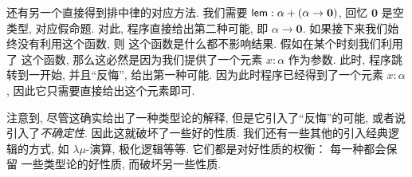 还有另一个直接得到排中律的对应方法. 我们需要
\(\textsf{lem} : \alpha + (\alpha \to \mathbf 0)\),
回忆 \(\mathbf 0\) 是空类型, 对应假命题.
对此, 程序直接给出第二种可能, 即 \(\alpha \to \mathbf 0\).
如果接下来我们始终没有利用这个函数, 则
这个函数是什么都不影响结果. 假如在某个时刻我们利用了
这个函数, 那么这必然是因为我们提供了一个元素 \(x : \alpha\)
作为参数. 此时, 程序跳转到一开始, 并且“反悔”,
给出第一种可能. 因为此时程序已经得到了一个元素 \(x : \alpha\),
因此它只需要直接给出这个元素即可.

注意到, 尽管这确实给出了一种类型论的解释, 但是它引入了“反悔”的可能,
或者说引入了\emph{不确定性}. 因此这就破坏了一些好的性质.
我们还有一些其他的引入经典逻辑的方式, 如 \(\lambda\mu\)-演算,
极化逻辑等等. 它们都是对好性质的权衡： 每一种都会保留
一些类型论的好性质, 而破坏另一些性质.
